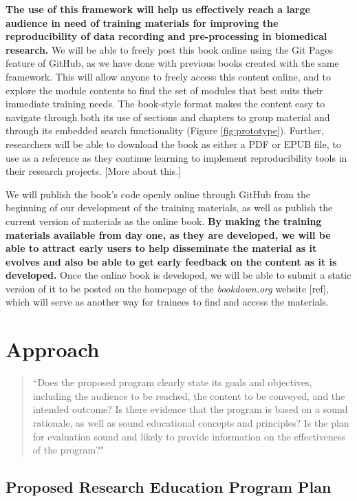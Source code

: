 \documentclass[pdftex,english,11pt,parskip=half]{scrartcl}
\begin{document}
\textbf{The use of this framework will help us effectively reach a large audience in need of training materials for improving the reproducibility of data recording and pre-processing in biomedical research.} We will be able to freely post this book online using the Git Pages feature of GitHub, as we have done with previous books created with the same framework. This will allow anyone to freely access this content online, and to explore the module contents to find the set of modules that best suits their immediate training needs. The book-style format makes the content easy to navigate through both its use of sections and chapters to group material and through its embedded search functionality (Figure \ref{fig:prototype}). Further, researchers will be able to download the book as either a PDF or EPUB file, to use as a reference as they continue learning to implement reproducibility tools in their research projects. [More about this.]

We will publish the book's code openly online through GitHub from the beginning of our development of the training materials, as well as publish the current version of materials as the online book. \textbf{By making the training materials available from day one, as they are developed, we will be able to attract early users to help disseminate the material as it evolves and also be able to get early feedback on the content as it is developed.} Once the online book is developed, we will be able to submit a static version of it to be posted on the homepage of the \textit{bookdown.org} website [ref], which will serve as another way for trainees to find and access the materials.

\section{Approach}

\begin{quotation}
``Does the proposed program clearly state its goals and objectives, including the audience to be reached, the content to be conveyed, and the intended outcome?  Is there evidence that the program is based on a sound rationale, as well as sound educational concepts and principles? Is the plan for evaluation sound and likely to provide information on the effectiveness of the program?"
\end{quotation}

\subsection{Proposed Research Education Program Plan}
\end{document}
